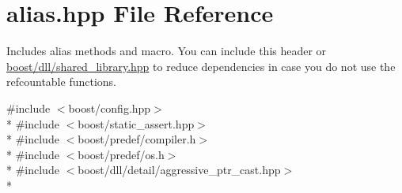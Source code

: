 \hypertarget{a00359}{}\section{alias.\+hpp File Reference}
\label{a00359}


Includes alias methods and macro. You can include this header or \hyperlink{a00726}{boost/dll/shared\+\_\+library.\+hpp} to reduce dependencies in case you do not use the refcountable functions.  


{\ttfamily \#include $<$boost/config.\+hpp$>$}\\*
{\ttfamily \#include $<$boost/static\+\_\+assert.\+hpp$>$}\\*
{\ttfamily \#include $<$boost/predef/compiler.\+h$>$}\\*
{\ttfamily \#include $<$boost/predef/os.\+h$>$}\\*
{\ttfamily \#include $<$boost/dll/detail/aggressive\+\_\+ptr\+\_\+cast.\+hpp$>$}\\*
